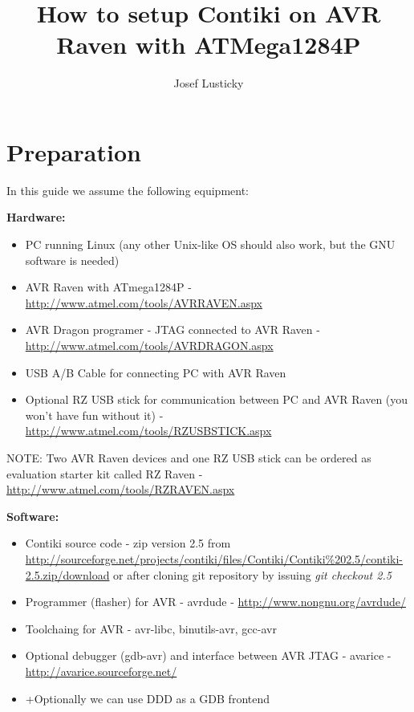 \documentclass{article}
\begin{document}
\title{How to setup Contiki on AVR Raven with ATMega1284P}
\author{Josef Lusticky}

\maketitle

\section{Preparation}
In this guide we assume the following equipment:

\vspace{0.2cm}

{\textbf{Hardware:}}
\begin{itemize}
	\item PC running Linux (any other Unix-like OS should also work, but the GNU software is needed)
	\item AVR Raven with ATmega1284P - \url{http://www.atmel.com/tools/AVRRAVEN.aspx}
	\item AVR Dragon programer - JTAG connected to AVR Raven - \url{http://www.atmel.com/tools/AVRDRAGON.aspx}
	\item USB A/B Cable for connecting PC with AVR Raven
	\item Optional RZ USB stick for communication between PC and AVR Raven
	(you won't have fun without it) - \url{http://www.atmel.com/tools/RZUSBSTICK.aspx}
\end{itemize}

NOTE: Two AVR Raven devices and one RZ USB stick can be ordered as
evaluation starter kit called RZ Raven - \url{http://www.atmel.com/tools/RZRAVEN.aspx}




\vspace{0.5cm}

{\textbf{Software:}}
\begin{itemize}
	\item Contiki source code - zip version 2.5 from\\
	\url{http://sourceforge.net/projects/contiki/files/Contiki/Contiki%202.5/contiki-2.5.zip/download}
	or after cloning git repository by issuing {\it{git checkout 2.5}}
	\item Programmer (flasher) for AVR - avrdude - \url{http://www.nongnu.org/avrdude/}
	\item Toolchaing for AVR - avr-libc, binutils-avr, gcc-avr
	\item Optional debugger (gdb-avr) and interface between AVR JTAG - avarice - \url{http://avarice.sourceforge.net/}
	\item +Optionally we can use DDD as a GDB frontend
\end{itemize}
\end{document}
